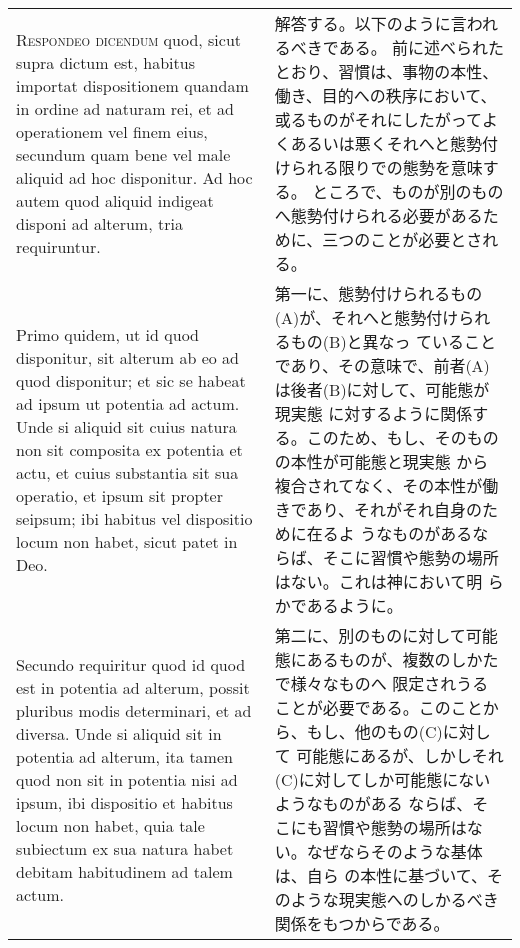 \documentclass[10pt]{jsarticle} %
\begin{document}
\begin{longtable}{p{21em}p{21em}}
\\



{\scshape Respondeo dicendum} quod, sicut supra dictum est, habitus importat
dispositionem quandam in ordine ad naturam rei, et ad operationem vel
finem eius, secundum quam bene vel male aliquid ad hoc disponitur. Ad
hoc autem quod aliquid indigeat disponi ad alterum, tria
requiruntur. 

&

解答する。以下のように言われるべきである。
前に述べられたとおり、習慣は、事物の本性、働き、目的への秩序において、或るものがそれにしたがってよくあるいは悪くそれへと態勢付けられる限りでの態勢を意味する。
ところで、ものが別のものへ態勢付けられる必要があるために、三つのことが必要とされる。

\\

Primo quidem, ut id quod disponitur, sit alterum ab eo ad
quod disponitur; et sic se habeat ad ipsum ut potentia ad actum. Unde
si aliquid sit cuius natura non sit composita ex potentia et actu, et
cuius substantia sit sua operatio, et ipsum sit propter seipsum; ibi
habitus vel dispositio locum non habet, sicut patet in Deo. 

&

第一に、態勢付けられるもの(A)が、それへと態勢付けられるもの(B)と異なっ
ていることであり、その意味で、前者(A)は後者(B)に対して、可能態が現実態
に対するように関係する。このため、もし、そのものの本性が可能態と現実態
から複合されてなく、その本性が働きであり、それがそれ自身のために在るよ
うなものがあるならば、そこに習慣や態勢の場所はない。これは神において明
らかであるように。

\\


Secundo
requiritur quod id quod est in potentia ad alterum, possit pluribus
modis determinari, et ad diversa. Unde si aliquid sit in potentia ad
alterum, ita tamen quod non sit in potentia nisi ad ipsum, ibi
dispositio et habitus locum non habet, quia tale subiectum ex sua
natura habet debitam habitudinem ad talem actum. 

&

第二に、別のものに対して可能態にあるものが、複数のしかたで様々なものへ
限定されうることが必要である。このことから、もし、他のもの(C)に対して
可能態にあるが、しかしそれ(C)に対してしか可能態にないようなものがある
ならば、そこにも習慣や態勢の場所はない。なぜならそのような基体は、自ら
の本性に基づいて、そのような現実態へのしかるべき関係をもつからである。



\end{longtable}
\end{document}
